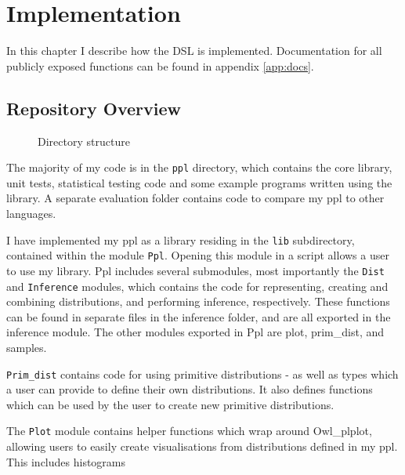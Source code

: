 \chapter{Implementation}
In this chapter I describe how the DSL is implemented. Documentation for all publicly exposed functions can be found in appendix \ref{app:docs}.

\section{Repository Overview}

\begin{figure}
	\caption{Directory structure}
	\label{fig:dirs}
\end{figure}

The majority of my code is in the \texttt{ppl} directory, which contains the core library, unit tests, statistical testing code and some example programs written using the library. A separate evaluation folder contains code to compare my ppl to other languages.

I have implemented my ppl as a library residing in the \texttt{lib} subdirectory, contained within the module \texttt{Ppl}. Opening this module in a script allows a user to use my library. Ppl includes several submodules, most importantly the \texttt{Dist} and \texttt{Inference} modules, which contains the code for representing, creating and combining distributions, and performing inference, respectively. These functions can be found in separate files in the inference folder, and are all exported in the inference module. The other modules exported in Ppl are plot, prim\_dist, and samples.

\texttt{Prim\_dist} contains code for using primitive distributions - as well as types which a user can provide to define their own distributions. It also defines functions which can be used by the user to create new primitive distributions.

The \texttt{Plot} module contains helper functions which wrap around Owl\_plplot, allowing users to easily create visualisations from distributions defined in my ppl. This includes histograms 

